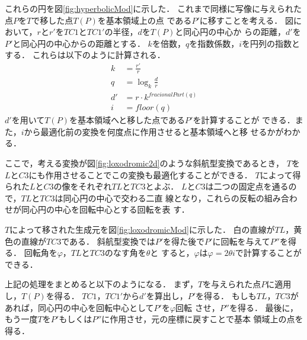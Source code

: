 これらの円を図\ref{fig:hyperbolicMod}に示した．
これまで同様に写像に与えられた点$P$を$T$で移した点$T(P)$を基本領域上の点
である$P'$に移すことを考える．
図において，$r$と$r'$を$TC1$と$TC1'$の半径，$d$を$T(P)$と同心円の中心か
らの距離，$d'$を$P'$と同心円の中心からの距離とする．
$k$を倍数，$q$を指数係数，$i$を円列の指数とする．
これらは以下のように計算される．
 \begin{align*}
  k& = \frac{r'}{r}\\
  q& = \log_{k} \frac{d}{r}\\
  d'& = r \cdot k^{fracionalPart(q)}\\
  i& = floor(q)
 \end{align*}
$d'$を用いて$T(P)$を基本領域へと移した点である$P'$を計算することが
できる．また，$i$から最適化前の変換を何度点に作用させると基本領域へと移
せるかがわかる．

ここで，考える変換が図\ref{fig:loxodromic2d}のような斜航型変換であるとき，
$T$を$L$と$C3$にも作用させることでこの変換も最適化することができる．
$T$によって得られた$L$と$C3$の像をそれぞれ$TL$と$TC3$とよぶ．
$L$と$C3$は二つの固定点を通るので，$TL$と$TC3$は同心円の中心で交わる二直
線となり，これらの反転の組み合わせが同心円の中心を回転中心とする回転を表
す．

$T$によって移された生成元を図\ref{fig:loxodromicMod}に示した．
白の直線が$TL$，黄色の直線が$TC3$である．
斜航型変換では$P'$を得た後で$P'$に回転を与えて$P''$を得る．
回転角を$\varphi$，$TL$と$TC3$のなす角を$\theta$と
すると，$\varphi$は$\varphi = 2 \theta i$で計算することができる．

上記の処理をまとめると以下のようになる．
まず，$T$を与えられた点$P$に適用し，$T(P)$を得る．
$TC1$，$TC1'$から$d'$を算出し，$P'$を得る．
もしも$TL$，$TC3$があれば，同心円の中心を回転中心として$P'$を$\varphi$回転
させ，$P''$を得る．
最後に，もう一度$T$を$P'$もしくは$P''$に作用させ，元の座標に戻すことで基本
領域上の点を得る．

